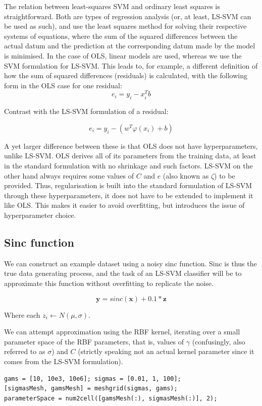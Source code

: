 \documentclass[10pt,a4paper]{article}
\begin{document}
The relation between least-squares SVM and ordinary least squares is straightforward. Both are types of regression analysis (or, at least, LS-SVM can be used as such), and use the least squares method for solving their respective systems of equations, where the sum of the squared differences between the actual datum and the prediction at the corresponding datum made by the model is minimised. In the case of OLS, linear models are used, whereas we use the SVM formulation for LS-SVM. This leads to, for example, a different definition of how the sum of squared differences (residuals) is calculated, with the following form in the OLS case for one residual:
$$
e_i = y_i - x_i^T b
$$

Contrast with the LS-SVM formulation of a residual:

$$
e_i = y_i - (w^T\varphi(x_i) + b)
$$

A yet larger difference between these is that OLS does not have hyperparameters, unlike LS-SVM. OLS derives all of its parameters from the training data, at least in the standard formulation with no shrinkage and such factors. LS-SVM on the other hand always requires some values of $C$ and $e$ (also known as $\zeta$) to be provided. Thus, regularisation is built into the standard formulation of LS-SVM through these hyperparameters, it does not have to be extended to implement it like OLS. This makes it easier to avoid overfitting, but introduces the issue of hyperparameter choice.

\subsection{Sinc function}

We can construct an example dataset using a noisy sinc function. Sinc is thus the true data generating process, and the task of an LS-SVM classifier will be to approximate this function without overfitting to replicate the noise.

$$
\mathbf{y} = sinc(\mathbf{x}) + 0.1 * \mathbf{z}
$$

Where each $z_i \leftarrow N(\mu, \sigma)$.

We can attempt approximation using the RBF kernel, iterating over a small parameter space of the RBF parameters, that is, values of $\gamma$ (confusingly, also referred to as $\sigma$) and $C$ (strictly speaking not an actual kernel parameter since it comes from the LS-SVM formulation).

\begin{lstlisting}[style=Matlab-editor]
gams = [10, 10e3, 10e6]; sigmas = [0.01, 1, 100];
[sigmasMesh, gamsMesh] = meshgrid(sigmas, gams);
parameterSpace = num2cell([gamsMesh(:), sigmasMesh(:)], 2);
\end{lstlisting}
\end{document}
